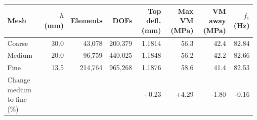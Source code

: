 \begin{tabular}{lrrrrrrr}
\toprule
Mesh & $h$ (mm) & Elements & DOFs & Top defl. (mm) & Max VM (MPa) & VM away (MPa) & $f_1$ (Hz) \\
\midrule
Coarse & 30.0 & 43,078 & 200,379 & 1.1814 & 56.3 & 42.4 & 82.84 \\
Medium & 20.0 & 96,759 & 440,025 & 1.1848 & 56.2 & 42.2 & 82.66 \\
Fine & 13.5 & 214,764 & 965,268 & 1.1876 & 58.6 & 41.4 & 82.53 \\
\midrule
Change medium to fine (\%) & & & & +0.23 & +4.29 & -1.80 & -0.16 \\
\bottomrule
\end{tabular}
